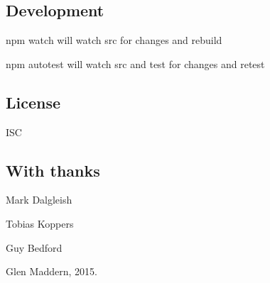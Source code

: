 \subsection*{Development}


\begin{DoxyItemize}
\item {\ttfamily npm watch} will watch {\ttfamily src} for changes and rebuild
\item {\ttfamily npm autotest} will watch {\ttfamily src} and {\ttfamily test} for changes and retest
\end{DoxyItemize}

\subsection*{License}

I\+SC

\subsection*{With thanks}


\begin{DoxyItemize}
\item Mark Dalgleish
\item Tobias Koppers
\item Guy Bedford 

 Glen Maddern, 2015. 
\end{DoxyItemize}